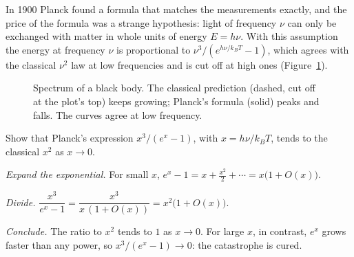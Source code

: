 In 1900 Planck found a formula that matches the measurements exactly, and the price of the formula was a strange hypothesis: light of frequency $\nu$ can only be exchanged with matter in whole units of energy $E=h\nu$. With this assumption the energy at frequency $\nu$ is proportional to $\nu^3/(e^{h\nu/k_BT}-1)$, which agrees with the classical $\nu^2$ law at low frequencies and is cut off at high ones (Figure~\ref{fig:blackbody}).

\begin{figure}[htb]
  \centering
  \caption{Spectrum of a black body. The classical prediction (dashed, cut off at the plot's top) keeps growing; Planck's formula (solid) peaks and falls. The curves agree at low frequency.}
  \label{fig:blackbody}
\end{figure}

\begin{example}\label{ex:planck-limit}
  Show that Planck's expression $x^3/(e^x-1)$, with $x=h\nu/k_BT$, tends to the classical $x^2$ as $x\to0$.
\end{example}
\begin{solution}
  \begin{steps}
    \item \emph{Expand the exponential.} For small $x$, $e^x-1=x+\tfrac{x^2}{2}+\cdots=x\bigl(1+O(x)\bigr)$.
    \item \emph{Divide.} $\dfrac{x^3}{e^x-1}=\dfrac{x^3}{x\,(1+O(x))}=x^2\bigl(1+O(x)\bigr)$.
    \item \emph{Conclude.} The ratio to $x^2$ tends to $1$ as $x\to0$. For large $x$, in contrast, $e^x$ grows faster than any power, so $x^3/(e^x-1)\to0$: the catastrophe is cured.
  \end{steps}
\end{solution}

